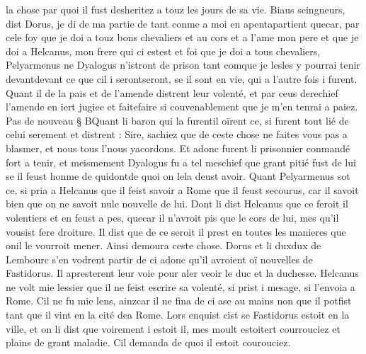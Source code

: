 \documentclass{article}
\begin{document}
\begin{pages}
      la chose par quoi il fust desheritez a touz les jours de sa vie. \pend
\pstart Biaus seingneurs, dist Dorus, 
   je di de ma partie de tant conme a moi en apentapartient 
   quecar, par cele foy que je doi 
   a touz bons chevaliers et 
   au cors et a l’ame mon pere et que je doi a Helcanus, 
   mon frere qui ci estest et foi que je doi a tous chevaliers, 
   Pelyarmenus ne Dyalogus 
   n’istront de prison tant comque je 
   lesles y pourrai tenir 
   devantdevant ce que cil i 
   serontseront, se il sont en vie, qui a l’autre fois i furent. 
   Quant il de la pais et de l’amende distrent leur volenté, et par ceus derechief l’amende en iert jugiee 
   et faitefaire si couvenablement que 
   je m’en tenrai a paiez. \pend
\pstart Pas de nouveau § BQuant 
   li baron qui la furentil oïrent ce, 
   si furent tout lié de celui serement et distrent :
   Sire, sachiez que de ceste chose ne faites vous pas a blasmer, et nous tous 
      l’nous yacordons.
   Et adonc furent li prisonnier conmandé fort a tenir, et 
   meismement 
   Dyalogus fu a tel meschief que grant pitié fust de lui se il feust honme 
   de quidontde quoi on 
   lela deust avoir. 
   Quant Pelyarmenus sot ce, si pria a Helcanus que 
   il feist savoir a Rome que il feust secourus, 
      car il savoit bien que on ne savoit nule nouvelle de lui. 
   Dont li dist Helcanus que ce feroit il volentiers et en feust a pes, 
      quecar il n’avroit pis 
      que le cors de lui, mes qu’il vousist fere droiture. 
   Il dist que de ce seroit il prest en toutes les manieres que 
      onil le vourroit 
      mener. \pend
\pstart Ainsi demoura ceste chose. Dorus et 
   li duxdux de Lembourc s’en vodrent partir 
   de ci adonc qu’il avroient oï nouvelles de Fastidorus. Il apresterent leur voie pour aler veoir 
   le duc et la duchesse. 
   Helcanus ne volt mie lessier que il ne feist escrire sa volenté, 
   si prist i mesage, si l’envoia a Rome. 
   Cil ne fu mie lens, ainzcar il ne fina 
      de ci ase au mains non que il potfist 
   tant que il vint en la cité dea Rome. 
   Lors enquist cist se 
      Fastidorus estoit en la ville, et on li dist que 
   voirement i estoit il, mes moult estoitert 
      courrouciez et plains de grant maladie. 
   Cil demanda de quoi il estoit courouciez.
   

\end{pages}
\end{document}
